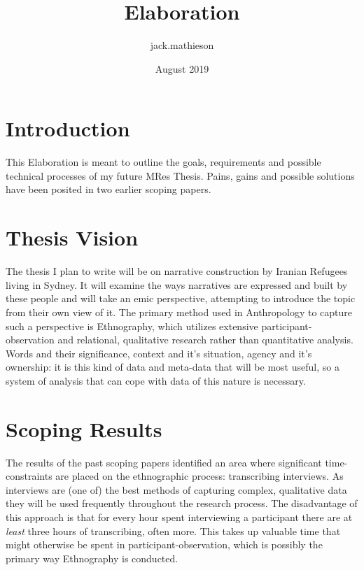 \documentclass{article}
\title{Elaboration}
\author{jack.mathieson }
\date{August 2019}
\begin{document}
\maketitle

\tableofcontents
\section{Introduction}
This Elaboration is meant to outline the goals, requirements and possible technical processes of my future MRes Thesis. Pains, gains and possible solutions have been posited in two earlier scoping papers. 

\section{Thesis Vision}
The thesis I plan to write will be on narrative construction by Iranian Refugees living in Sydney. It will examine the ways narratives are expressed and built by these people and will take an emic perspective, attempting to introduce the topic from their own view of it. The primary method used in Anthropology to capture such a perspective is Ethnography, which utilizes extensive participant-observation and relational, qualitative research rather than quantitative analysis. Words and their significance, context and it's situation, agency and it's ownership: it is this kind of data and meta-data that will be most useful, so a system of analysis that can cope with data of this nature is necessary.
    
\section{ Scoping Results}

The results of the past scoping papers identified an area where significant time-constraints are placed on the ethnographic process: transcribing interviews. As interviews are (one of) the best methods of capturing complex, qualitative data they will be used frequently throughout the research process. The disadvantage of this approach is that for every hour spent interviewing a participant there are at \textit{least} three hours of transcribing, often more. This takes up valuable time that might otherwise be spent in participant-observation, which is possibly the primary way
Ethnography is conducted.
\end{document}

